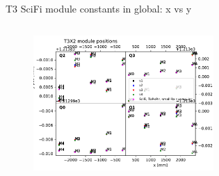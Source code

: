 \documentclass[aspectratio=1610, 12pt]{beamer}
\begin{document}
\begin{frame}{T3 SciFi module constants in global: x vs y}
\begin{columns}
\begin{column}[c]{0.5\textwidth}
\begin{figure}
        \includegraphics[width=0.61\textwidth]{plots/out_x_y_pos/retest_x_vs_zT3X2.pdf}
      \end{figure}
    \end{column}
  \end{columns}
\end{frame}
\end{document}
